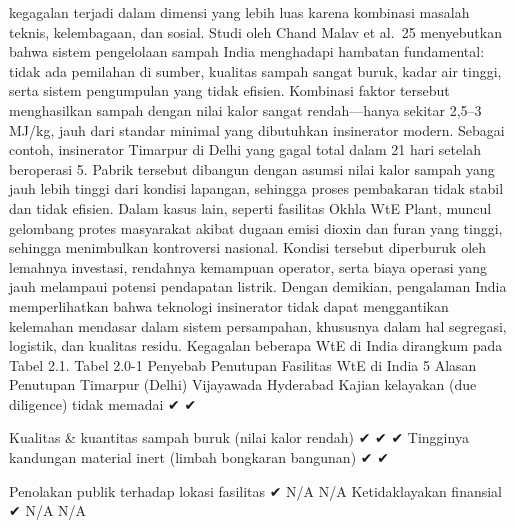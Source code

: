 \documentclass[
  letterpaper,
  DIV=11,
  numbers=noendperiod]{scrreprt}
\begin{document}
kegagalan terjadi dalam dimensi yang lebih luas karena kombinasi masalah
teknis, kelembagaan, dan sosial. Studi oleh Chand Malav et al.~25
menyebutkan bahwa sistem pengelolaan sampah India menghadapi hambatan
fundamental: tidak ada pemilahan di sumber, kualitas sampah sangat
buruk, kadar air tinggi, serta sistem pengumpulan yang tidak efisien.
Kombinasi faktor tersebut menghasilkan sampah dengan nilai kalor sangat
rendah---hanya sekitar 2,5--3 MJ/kg, jauh dari standar minimal yang
dibutuhkan insinerator modern. Sebagai contoh, insinerator Timarpur di
Delhi yang gagal total dalam 21 hari setelah beroperasi 5. Pabrik
tersebut dibangun dengan asumsi nilai kalor sampah yang jauh lebih
tinggi dari kondisi lapangan, sehingga proses pembakaran tidak stabil
dan tidak efisien. Dalam kasus lain, seperti fasilitas Okhla WtE Plant,
muncul gelombang protes masyarakat akibat dugaan emisi dioxin dan furan
yang tinggi, sehingga menimbulkan kontroversi nasional. Kondisi tersebut
diperburuk oleh lemahnya investasi, rendahnya kemampuan operator, serta
biaya operasi yang jauh melampaui potensi pendapatan listrik. Dengan
demikian, pengalaman India memperlihatkan bahwa teknologi insinerator
tidak dapat menggantikan kelemahan mendasar dalam sistem persampahan,
khususnya dalam hal segregasi, logistik, dan kualitas residu. Kegagalan
beberapa WtE di India dirangkum pada Tabel 2.1. Tabel 2.0-1 Penyebab
Penutupan Fasilitas WtE di India 5 Alasan Penutupan Timarpur (Delhi)
Vijayawada Hyderabad Kajian kelayakan (due diligence) tidak memadai ✔ ✔

Kualitas \& kuantitas sampah buruk (nilai kalor rendah) ✔ ✔ ✔ Tingginya
kandungan material inert (limbah bongkaran bangunan) ✔ ✔

Penolakan publik terhadap lokasi fasilitas ✔ N/A N/A Ketidaklayakan
finansial ✔ N/A N/A
\end{document}
